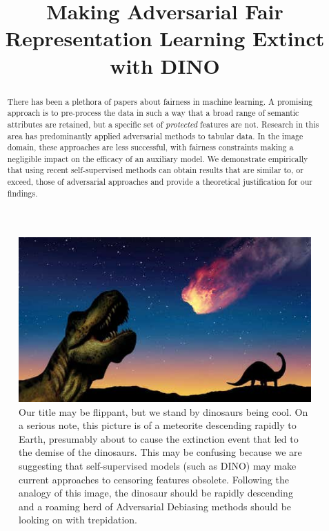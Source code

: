 \documentclass{bmvc2k}
\title{Making Adversarial Fair Representation Learning Extinct with DINO}
\begin{document}
\maketitle

\begin{abstract}
There has been a plethora of papers about fairness in machine learning.
A promising approach is to pre-process the data in such a way that a broad range of semantic attributes are retained, but a specific set of \emph{protected} features are not.
Research in this area has predominantly applied adversarial methods to tabular data.
In the image domain, these approaches are less successful, with fairness constraints making a negligible impact on the efficacy of an auxiliary model.
We demonstrate empirically that using recent self-supervised methods can obtain results that are similar to, or exceed, those of adversarial approaches and provide a theoretical justification for our findings.
\end{abstract}


\begin{figure}[t]
    \centering
    \includegraphics[width=\textwidth]{paper/assets/in-dinosaur killing comet.jpeg}
    \caption{Our title may be flippant, but we stand by dinosaurs being cool. On a serious note, this picture is of a meteorite descending rapidly to Earth, presumably about to cause the extinction event that led to the demise of the dinosaurs. This may be confusing because we are suggesting that self-supervised models (such as DINO) may make current approaches to censoring features obsolete. Following the analogy of this image, the dinosaur should be rapidly descending and a roaming herd of Adversarial Debiasing methods should be looking on with trepidation.}
    \label{fig:my_label}
\end{figure}
\end{document}
